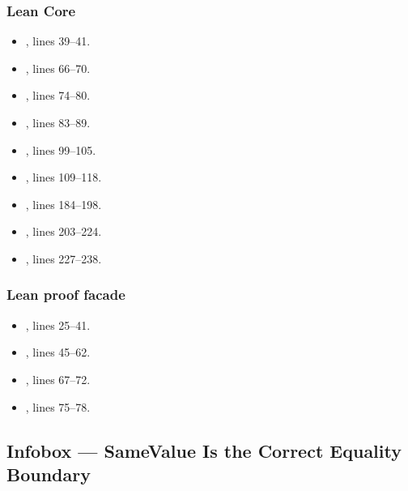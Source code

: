 \subsubsection{Lean Core}\label{lean-core-4}

\begin{itemize}
\tightlist
\item
  \texttt{\protect{}}, lines 39--41.
\item
  \texttt{\protect{}}, lines 66--70.
\item
  \texttt{\protect{}}, lines 74--80.
\item
  \texttt{\protect{}}, lines 83--89.
\item
  \texttt{\protect{}}, lines 99--105.
\item
  \texttt{\protect{}}, lines 109--118.
\item
  \texttt{\protect{}}, lines 184--198.
\item
  \texttt{\protect{}}, lines 203--224.
\item
  \texttt{\protect{}}, lines 227--238.
\end{itemize}

\subsubsection{Lean proof facade}\label{lean-proof-facade}

\begin{itemize}
\tightlist
\item
  \texttt{\protect{}}, lines 25--41.
\item
  \texttt{\protect{}}, lines 45--62.
\item
  \texttt{\protect{}}, lines 67--72.
\item
  \texttt{\protect{}}, lines 75--78.
\end{itemize}

\subsection{Infobox --- SameValue Is the Correct Equality
Boundary}\label{infobox-samevalue-is-the-correct-equality-boundary}

